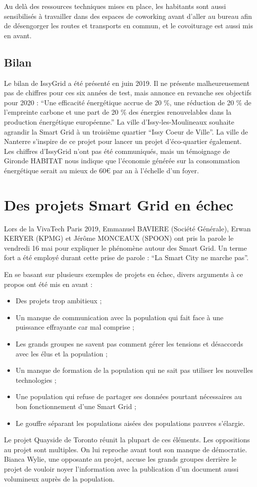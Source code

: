 Au delà des ressources techniques mises en place, les habitants sont aussi sensibilisés à travailler
dans des espaces de coworking avant d'aller au bureau afin de désengorger les routes et transports
en commun, et le covoiturage est aussi mis en avant.

\subsection{Bilan}
Le bilan de IssyGrid a été présenté en juin 2019.
Il ne présente malheureusement pas de chiffres pour ces six années de test, mais annonce en revanche
ses objectifs pour 2020 : ``Une efficacité énergétique accrue de 20 \%, une réduction de 20 \%
de l’empreinte carbone et une part de 20 \% des énergies renouvelables dans la production
énergétique européenne.''
La ville d'Issy-les-Moulineaux souhaite agrandir la Smart Grid à un troisième quartier
``Issy Coeur de Ville''. La ville de Nanterre s'inspire de ce projet pour lancer un projet
d'éco-quartier également.
Les chiffres d'IssyGrid n'ont pas été communiqués, mais un témoignage de Gironde HABITAT nous indique
que l'économie générée sur la consommation énergétique serait au mieux de 60€ par an à l'échelle d'un
foyer.


\section{Des projets Smart Grid en échec}

Lors de la VivaTech Paris 2019, Emmanuel BAVIERE (Société Générale), Erwan KERYER (KPMG)
et Jérôme MONCEAUX (SPOON) ont pris la parole le vendredi 16 mai pour expliquer le phénomène autour des
Smart Grid. Un terme fort a été employé durant cette prise de parole :
``La Smart City ne marche pas''.

En se basant sur plusieurs exemples de projets en échec, divers arguments à ce propos ont été mis en
avant :
\begin{itemize}
    \item Des projets trop ambitieux ;
    \item Un manque de communication avec la population qui fait face à une puissance effrayante car mal comprise ;
    \item Les grands groupes ne savent pas comment gérer les tensions et désaccords avec les élus et la population ;
    \item Un manque de formation de la population qui ne sait pas utiliser les nouvelles technologies ;
    \item Une population qui refuse de partager ses données pourtant nécessaires au bon fonctionnement d’une Smart Grid ;
    \item Le gouffre séparant les populations aisées des populations pauvres s'élargie.
\end{itemize}

Le projet Quayside de Toronto réunit la plupart de ces éléments.
Les oppositions au projet sont multiples. On lui reproche avant tout son manque de démocratie.
Bianca Wylie, une opposante au projet, accuse les grands groupes derrière le projet de vouloir noyer l'information
avec la publication d'un document aussi volumineux auprès de la population.